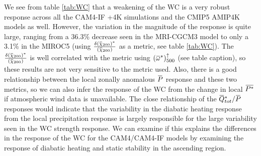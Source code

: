 \documentclass[letterpaper,12pt,titlepage,oneside,final]{book}
\newcommand{\overbar}[1]{\mkern 1.5mu\overline{\mkern-1.5mu#1\mkern-1.5mu}\mkern 1.5mu}
\begin{document}
We see from table \ref{tab:WC} that a weakening of the WC is a very robust response across all the CAM4-IF +4K simulations and the CMIP5 AMIP4K models as well. However, the variation in the magnitude of the response is quite large, ranging from a 36.3\% decrease seen in the MRI-CGCM3 model to only a 3.1\% in the MIROC5 (using $\frac{\delta(\overbar{\chi}_{200})^{*}}{(\overbar{\chi}_{200})}$ as a metric, see table \ref{tab:WC}). The $\frac{\delta(\overbar{\chi}_{200})^{*}}{(\overbar{\chi}_{200})}$ is well correlated with the metric using ${(\overbar{\omega}^{*})_{500}^{\uparrow}}$ (see table caption), so these results are not very sensitive to the metric used. Also, there is a good relationship between the local zonally anomalous $\overbar{P}$ response and these two metrics, so we can also infer the response of the WC from the change in local $\overbar{P^{*}}$ if atmospheric wind data is unavailable. The close relationship of the $\overbar{Q}_{tot}^{*}/\overbar{P}$ responses would indicate that the variability in the diabatic heating response from the local precipitation response is largely responsible for the large variability seen in the WC strength response. We can examine if this explains the differences in the response of the WC for the CAM4/CAM4-IF models by examining the response of diabatic heating and static stability in the ascending region.
\end{document}
